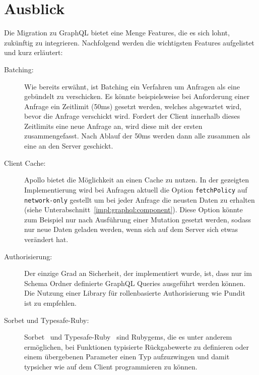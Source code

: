 \section{Ausblick}
Die Migration zu GraphQL bietet eine Menge Features, die es sich lohnt, zukünftig zu integrieren.
Nachfolgend werden die wichtigsten Features aufgelistet und kurz erläutert: 
\begin{description}
	\item[Batching:] Wie bereits erwähnt, ist Batching ein Verfahren um Anfragen als eine gebündelt zu verschicken. Es könnte beispielsweise bei Anforderung einer Anfrage ein Zeitlimit (50ms) gesetzt werden, welches abgewartet wird, bevor die Anfrage verschickt wird. Fordert der Client innerhalb dieses Zeitlimits eine neue Anfrage an, wird diese mit der ersten zusammengefasst. Nach Ablauf der 50ms werden dann alle zusammen als eine an den Server geschickt. 
	\item[Client Cache:] Apollo bietet die Möglichkeit an einen Cache zu nutzen. In der gezeigten Implementierung wird bei Anfragen aktuell die Option \texttt{fetchPolicy} auf \texttt{network\--only} gestellt um bei jeder Anfrage die neusten Daten zu erhalten (siehe Unterabschnitt~\ref{impl:graphql:component}). Diese Option könnte zum Beispiel nur nach Ausführung einer Mutation gesetzt werden, sodass nur neue Daten geladen werden, wenn sich auf dem Server sich etwas verändert hat.
	\item[Authorisierung:] Der einzige Grad an Sicherheit, der implementiert wurde, ist, dass nur im Schema Ordner definierte GraphQL Queries ausgeführt werden können. Die Nutzung einer Library für rollenbasierte Authorisierung wie Pundit~\cite{pundit} ist zu empfehlen.
	\item[Sorbet und Typesafe-Ruby:] Sorbet~\cite{sorbet} und Typesafe-Ruby~\cite{typesafe-ruby} sind Rubygems, die es unter anderem ermöglichen, bei Funktionen typisierte Rückgabewerte zu definieren oder einem übergebenen Parameter einen Typ aufzuzwingen und damit typsicher wie auf dem Client programmieren zu können. 
\end{description}
